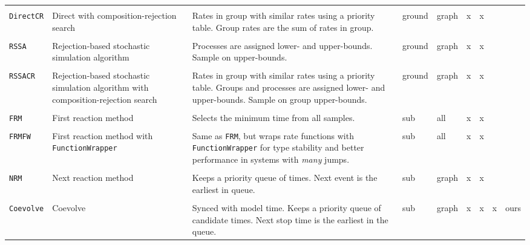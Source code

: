 \documentclass{juliacon}
\numberwithin{equation}{section}
\begin{document}
\begin{table}
\begin{tabular}{lL{3.3cm}L{3.9cm}llllll}
& & & & & & & & \\

\texttt{DirectCR}
  & Direct with composition-rejection search
  & Rates in group with similar rates using a priority table. Group rates are the sum of rates in group.
  & ground
  & graph
  & x
  & x
  &
  & \cite{slepoy2008}
  \\

& & & & & & & & \\


\texttt{RSSA}
  & Rejection-based stochastic simulation algorithm
  & Processes are assigned lower- and upper-bounds. Sample on upper-bounds.
  & ground
  & graph
  & x
  & x
  &
  & \cite{thanh2014}
  \\

& & & & & & & & \\

\texttt{RSSACR}
  & Rejection-based stochastic simulation algorithm with composition-rejection search
  & Rates in group with similar rates using a priority table. Groups and processes are assigned lower- and upper-bounds. Sample on group upper-bounds. 
  & ground
  & graph
  & x
  & x
  &
  & \cite{thanh2017}
  \\

& & & & & & & & \\

\texttt{FRM}
  & First reaction method
  & Selects the minimum time from all samples.
  & sub
  & all
  & x
  & x
  &
  & \cite{gillespie1976}
  \\

& & & & & & & & \\

\texttt{FRMFW}
  & First reaction method with \texttt{FunctionWrapper}
  & Same as \texttt{FRM}, but wraps rate functions with \texttt{FunctionWrapper} for type stability and better performance in systems with \textit{many} jumps.
  & sub
  & all
  & x
  & x
  &
  & \cite{gillespie1976}
  \\

& & & & & & & & \\

\texttt{NRM}
  & Next reaction method
  & Keeps a priority queue of times. Next event is the earliest in queue.
  & sub
  & graph
  & x
  & x
  &
  & \cite{gibson2000}
  \\

& & & & & & & & \\

\texttt{Coevolve}
  & Coevolve
  & Synced with model time. Keeps a priority queue of candidate times. Next stop time is the earliest in the queue.
  & sub
  & graph
  & x
  & x
  & x
  & ours
  \\


\end{tabular}
\end{table}
\end{document}
